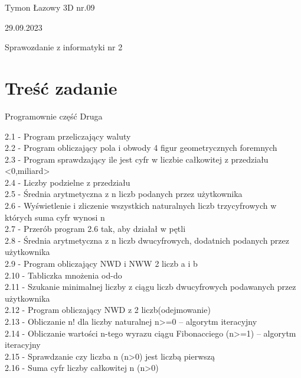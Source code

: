 \documentclass[a4paper,twoside,7pt]{book}
\begin{document}
\raggedcolumns
\begin{center}
    \begin{multicols}{2}
    \begin{flushleft}
    \large{Tymon Łazowy 3D nr.09} \\
    \end{flushleft}
    
    \begin{flushright}
    \large{29.09.2023}\\
    \end{flushright}
    \end{multicols}
    {\LARGE Sprawozdanie z informatyki nr 2} \\ \vspace{0pt}
\end{center}

\section{Treść zadanie}
\begin{center}
\large{Programownie część Druga}\\

\begin{itemize}[ label={}]
    \normalsize{\item{
    {2.1 - Program przeliczający waluty}{} \\
    {2.2 - Program obliczający pola i obwody 4 figur geometrycznych foremnych}{} \\
    {2.3 - Program sprawdzający ile jest cyfr w liczbie całkowitej z przedziału <0,miliard> \\
    {2.4 - Liczby podzielne z przedziału}{} \\
    {2.5 - Średnia arytmetyczna z n liczb podanych przez użytkownika}{} \\
    {2.6 - Wyświetlenie i zliczenie wszystkich naturalnych liczb trzycyfrowych w których suma
cyfr wynosi n}{} \\
    {2.7 - Przerób program 2.6 tak, aby działał w pętli}{} \\
    {2.8 - Średnia arytmetyczna z n liczb dwucyfrowych, dodatnich podanych przez użytkownika}{} \\
    {2.9 - Program obliczający NWD i NWW 2 liczb a i b}{} \\
    {2.10 - Tabliczka mnożenia od-do}{} \\
    {2.11 - Szukanie minimalnej liczby z ciągu liczb dwucyfrowych podawanych przez użytkownika}{}\\
    {2.12 - Program obliczający NWD z 2 liczb(odejmowanie)}{}\\
    {2.13 - Obliczanie n! dla liczby naturalnej n>=0 – algorytm iteracyjny}{}\\
    {2.14 - Obliczanie wartości n-tego wyrazu ciągu Fibonacciego (n>=1) – algorytm iteracyjny}{}\\
    {2.15 - Sprawdzanie czy liczba n (n>0) jest liczbą pierwszą}{}\\
    {2.16 -  Suma cyfr liczby całkowitej n (n>0)}{}\\
}}}
\end{itemize}

\end{center}
\end{document}
